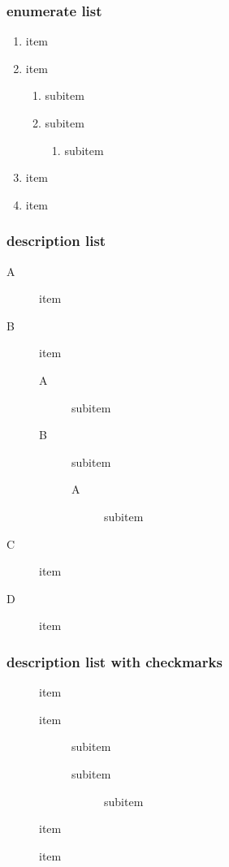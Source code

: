 \begin{frame}
\frametitle{enumerate list}
\begin{enumerate}
\item item
\item item
    \begin{enumerate}
    \item subitem
    \item subitem
        \begin{enumerate}
        \item subitem
        \end{enumerate}
    \end{enumerate}
\item item
\item item
\end{enumerate}
\end{frame}

\begin{frame}
\frametitle{description list}
\begin{description}
\item[A] item
\item[B] item
    \begin{description}
    \item[A] subitem
    \item[B] subitem
        \begin{description}
        \item[A] subitem
        \end{description}
    \end{description}
\item[C] item
\item[D] item
\end{description}
\end{frame}


\begin{frame}
\frametitle{description list with checkmarks}
\begin{description}
\item[\Checkmark] item
\item[\Checkmark] item
    \begin{description}
    \item[\Checkmark] subitem
    \item[\textbullet] subitem
        \begin{description}
        \item[\textbullet] subitem
        \end{description}
    \end{description}
\item[\Checkmark] item
\item[\XSolidBrush] item
\end{description}
\end{frame}

